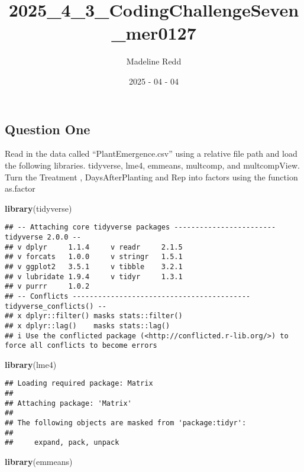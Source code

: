 \documentclass[
  12pt,
]{article}
\title{2025\_4\_3\_CodingChallengeSeven\_mer0127}
\author{Madeline Redd}
\date{2025 - 04 - 04}
\newenvironment{Shaded}{\begin{snugshade}}{\end{snugshade}}
\newcommand{\FunctionTok}[1]{\textcolor[rgb]{0.13,0.29,0.53}{\textbf{#1}}}
\newcommand{\NormalTok}[1]{#1}
\begin{document}
\maketitle

\subsection{Question One}\label{question-one}

Read in the data called ``PlantEmergence.csv'' using a relative file
path and load the following libraries. tidyverse, lme4, emmeans,
multcomp, and multcompView. Turn the Treatment , DaysAfterPlanting and
Rep into factors using the function as.factor

\begin{Shaded}
\begin{Highlighting}[]
\FunctionTok{library}\NormalTok{(tidyverse)}
\end{Highlighting}
\end{Shaded}

\begin{verbatim}
## -- Attaching core tidyverse packages ------------------------ tidyverse 2.0.0 --
## v dplyr     1.1.4     v readr     2.1.5
## v forcats   1.0.0     v stringr   1.5.1
## v ggplot2   3.5.1     v tibble    3.2.1
## v lubridate 1.9.4     v tidyr     1.3.1
## v purrr     1.0.2     
## -- Conflicts ------------------------------------------ tidyverse_conflicts() --
## x dplyr::filter() masks stats::filter()
## x dplyr::lag()    masks stats::lag()
## i Use the conflicted package (<http://conflicted.r-lib.org/>) to force all conflicts to become errors
\end{verbatim}

\begin{Shaded}
\begin{Highlighting}[]
\FunctionTok{library}\NormalTok{(lme4)}
\end{Highlighting}
\end{Shaded}

\begin{verbatim}
## Loading required package: Matrix
## 
## Attaching package: 'Matrix'
## 
## The following objects are masked from 'package:tidyr':
## 
##     expand, pack, unpack
\end{verbatim}

\begin{Shaded}
\begin{Highlighting}[]
\FunctionTok{library}\NormalTok{(emmeans)}
\end{Highlighting}
\end{Shaded}
\end{document}
